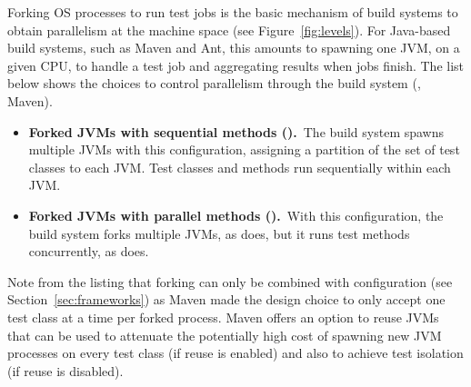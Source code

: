 \documentclass[10pt,journal,compsoc]{IEEEtran}
\begin{document}
Forking OS processes to run test jobs is the basic mechanism of build
systems to obtain parallelism at the machine space (see
Figure~\ref{fig:levels}).  For Java-based build systems, such as Maven
and Ant, this amounts to spawning one JVM, on a given CPU, to handle a
test job and aggregating results when jobs finish.  The list below
shows the choices to control parallelism through the build system
(\eg{}, Maven).

\begin{itemize}
\item
  \textbf{Forked JVMs with sequential methods (\ForkSeq).}~The build
  system spawns multiple JVMs with this configuration, assigning a
  partition of the set of test classes to each JVM.  Test classes and methods
  run sequentially within each JVM.
\item
  \textbf{Forked JVMs with parallel methods (\ForkParMeth).}~With
  this configuration, the build system forks multiple JVMs, as
  \ForkSeq{} does, but it runs test methods concurrently, as
  \SeqClassParMeth{} does.
\end{itemize}


Note from the listing that forking can only be combined with
configuration \SeqClassParMeth{} (see Section~\ref{sec:frameworks}) as
Maven made the design choice to only accept one test class at a time
per forked process.  Maven offers an option to reuse JVMs that can be
used to attenuate the potentially high cost of spawning new JVM
processes on every test class (if reuse is enabled) and also to
achieve test isolation (if reuse is disabled).
\end{document}
